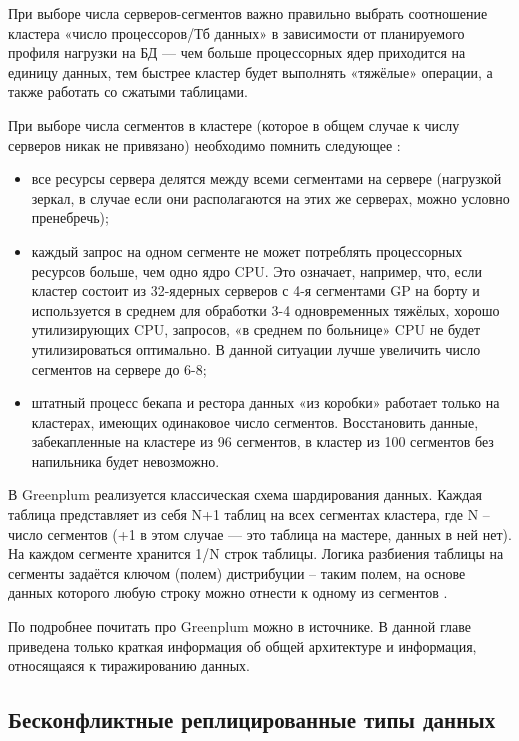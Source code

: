 При выборе числа серверов-сегментов важно правильно выбрать соотношение кластера «число процессоров/Тб данных» в
зависимости от планируемого профиля нагрузки на БД — чем больше процессорных ядер приходится на единицу данных, тем
быстрее кластер будет выполнять «тяжёлые» операции, а также работать со сжатыми таблицами.

При выборе числа сегментов в кластере (которое в общем случае к числу серверов никак не привязано) необходимо помнить
следующее \autocite{Greenplum}:
\begin{itemize}
    \item все ресурсы сервера делятся между всеми сегментами на сервере (нагрузкой зеркал, в случае если они располагаются на этих же серверах, можно условно пренебречь);
    \item каждый запрос на одном сегменте не может потреблять процессорных ресурсов больше, чем одно ядро CPU. Это означает, например, что, если кластер состоит из 32-ядерных серверов с 4-я сегментами GP на борту и используется в среднем для обработки 3-4 одновременных тяжёлых, хорошо утилизирующих CPU, запросов, «в среднем по больнице» CPU не будет утилизироваться оптимально. В данной ситуации лучше увеличить число сегментов на сервере до 6-8;
    \item штатный процесс бекапа и рестора данных «из коробки» работает только на кластерах, имеющих одинаковое число сегментов. Восстановить данные, забекапленные на кластере из 96 сегментов, в кластер из 100 сегментов без напильника будет невозможно.
\end{itemize}

В Greenplum реализуется классическая схема шардирования данных. Каждая таблица представляет из себя N+1 таблиц на всех
сегментах кластера, где N – число сегментов (+1 в этом случае — это таблица на мастере, данных в ней нет). На каждом
сегменте хранится 1/N строк таблицы. Логика разбиения таблицы на сегменты задаётся ключом (полем) дистрибуции – таким
полем, на основе данных которого любую строку можно отнести к одному из сегментов \autocite{Greenplum}.

По подробнее почитать про Greenplum можно в источнике. В данной главе приведена только краткая информация об общей
архитектуре и информация, относящаяся к тиражированию данных. \autocite{Greenplum}

\subsection{Бесконфликтные реплицированные типы данных}
